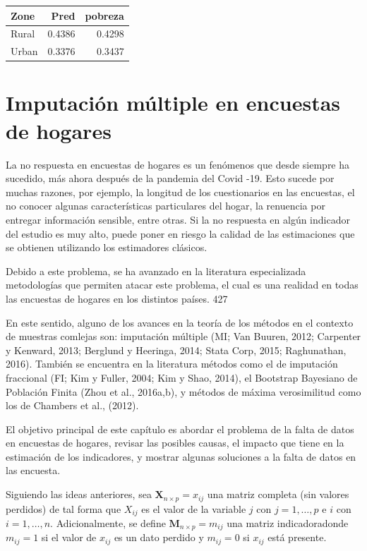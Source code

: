 \documentclass[
  12pt,
]{book}
\begin{document}
\begin{tabular}{l|r|r}
\hline
Zone & Pred & pobreza\\
\hline
Rural & 0.4386 & 0.4298\\
\hline
Urban & 0.3376 & 0.3437\\
\hline
\end{tabular}

\hypertarget{imputaciuxf3n-muxfaltiple-en-encuestas-de-hogares}{%
\chapter{Imputación múltiple en encuestas de hogares}\label{imputaciuxf3n-muxfaltiple-en-encuestas-de-hogares}}

La no respuesta en encuestas de hogares es un fenómenos que desde siempre ha sucedido, más ahora después de la pandemia del Covid -19. Esto sucede por muchas razones, por ejemplo, la longitud de los cuestionarios en las encuestas, el no conocer algunas características particulares del hogar, la renuencia por entregar información sensible, entre otras. Si la no respuesta en algún indicador del estudio es muy alto, puede poner en riesgo la calidad de las estimaciones que se obtienen utilizando los estimadores clásicos.

Debido a este problema, se ha avanzado en la literatura especializada metodologías que permiten atacar este problema, el cual es una realidad en todas las encuestas de hogares en los distintos países. 427

En este sentido, alguno de los avances en la teoría de los métodos en el contexto de muestras comlejas son: imputación múltiple (MI; Van Buuren, 2012; Carpenter y Kenward, 2013; Berglund y Heeringa, 2014; Stata Corp, 2015; Raghunathan, 2016). También se encuentra en la literatura métodos como el de imputación fraccional (FI; Kim y Fuller, 2004; Kim y Shao, 2014), el Bootstrap Bayesiano de Población Finita (Zhou et al., 2016a,b), y métodos de máxima verosimilitud como los de Chambers et al., (2012).

El objetivo principal de este capítulo es abordar el problema de la falta de datos en encuestas de hogares, revisar las posibles causas, el impacto que tiene en la estimación de los indicadores, y mostrar algunas soluciones a la falta de datos en las encuesta.

Siguiendo las ideas anteriores, sea \(\boldsymbol{X}_{n \times p} = x_{ij}\) una matriz completa (sin valores perdidos) de tal forma que \(X_{ij}\) es el valor de la variable \(j\) con \(j=1, \dots, p\) e \(i\) con \(i=1, \dots, n\). Adicionalmente, se define \(\boldsymbol{M}_{n \times p} = m_{ij}\) una matriz indicadoradonde \(m_{ij} = 1\) si el valor de \(x_{ij}\) es un dato perdido y \(m_{ij}=0\) si \(x_{ij}\) está presente.
\end{document}
